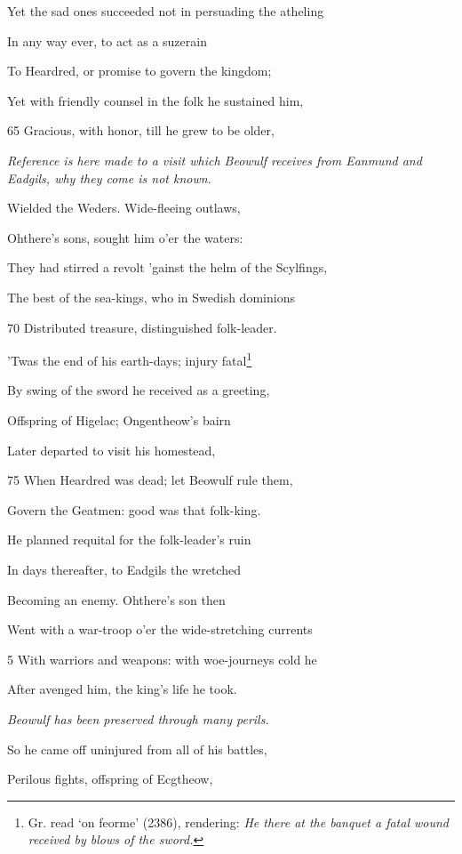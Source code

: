 Yet the sad ones succeeded not in persuading the atheling

In any way ever, to act as a suzerain

To Heardred, or promise to govern the kingdom;

Yet with friendly counsel in the folk he sustained him,

65
Gracious, with honor, till he grew to be older,

\emph{Reference is here
made to a visit
which Beowulf receives
from Eanmund
and Eadgils,
why they come is
not known.}

Wielded the Weders. Wide-fleeing outlaws,

Ohthere’s sons, sought him o’er the waters:

They had stirred a revolt ’gainst the helm of the Scylfings,

The best of the sea-kings, who in Swedish dominions

70
Distributed treasure, distinguished folk-leader.

’Twas the end of his earth-days; injury fatal\footnote{Gr. read ‘on feorme’ (2386), rendering: \emph{He there at the banquet a fatal
wound received by blows of the sword.}}

By swing of the sword he received as a greeting,

Offspring of Higelac; Ongentheow’s bairn

Later departed to visit his homestead,

75
When Heardred was dead; let Beowulf rule them,

Govern the Geatmen: good was that folk-king.



He planned requital for the folk-leader’s ruin

In days thereafter, to Eadgils the wretched

Becoming an enemy. Ohthere’s son then

Went with a war-troop o’er the wide-stretching currents

5
With warriors and weapons: with woe-journeys cold he

After avenged him, the king’s life he took.

\emph{Beowulf has been
preserved through
many perils.}

So he came off uninjured from all of his battles,

Perilous fights, offspring of Ecgtheow,


